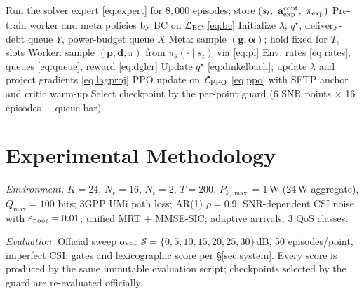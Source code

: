 \documentclass[journal]{IEEEtran}
\newcommand{\vect}[1]{\mathbf{#1}}
\begin{document}
\begin{algorithm}[!t]
\caption{Two-timescale hierarchical training with solver-expert distillation (SFTP)}
\label{alg:train}
\begin{algorithmic}[1]
\State Run the solver expert \eqref{eq:expert} for $8{,}000$ episodes; store $(s_t,\ \vect{a}^{\rm cont}_{\rm exp},\ \pi_{\rm exp})$
\State Pre-train worker and meta policies by BC on $\mathcal{L}_{\rm BC}$ \eqref{eq:bc}
\State Initialize $\lambda$, $q^\star$, delivery-debt queue $Y$, power-budget queue $X$
  \State Meta: sample $(\vect{g},\vect{\alpha})$; hold fixed for $T_s$ slots
    \State Worker: sample $(\vect{p},\vect{d},\pi)$ from $\pi_\theta(\cdot\mid s_t)$ via \eqref{eq:pl}
    \State Env: rates \eqref{eq:rates}, queues \eqref{eq:queue}, reward \eqref{eq:dglcr}
  \EndFor
  \State Update $q^\star$ \eqref{eq:dinkelbach}; update $\lambda$ and project gradients \eqref{eq:lagproj}
  \State PPO update on $\mathcal{L}_{\rm PPO}$ \eqref{eq:ppo} with SFTP anchor and critic warm-up
\EndFor
\State Select checkpoint by the per-point guard (6 SNR points $\times$ 16 episodes + queue bar)
\end{algorithmic}
\end{algorithm}

\section{Experimental Methodology}
\label{sec:methodology}

\emph{Environment.} $K=24$, $N_r=16$, $N_t=2$, $T=200$, $P_{k,\max}=1$\,W (24\,W
aggregate), $Q_{\max}=100$ bits; 3GPP UMi path loss; AR(1) $\rho=0.9$;
SNR-dependent CSI noise with $\varepsilon_{\rm floor}=0.01$; unified MRT +
MMSE-SIC; adaptive arrivals; 3 QoS classes.

\emph{Evaluation.} Official sweep over $\mathcal{S}=\{0,5,10,15,20,25,30\}$\,dB, 50
episodes/point, imperfect CSI; gates and lexicographic score per
\S\ref{sec:system}. Every score is produced by the same immutable evaluation
script; checkpoints selected by the guard are re-evaluated officially.
\end{document}
